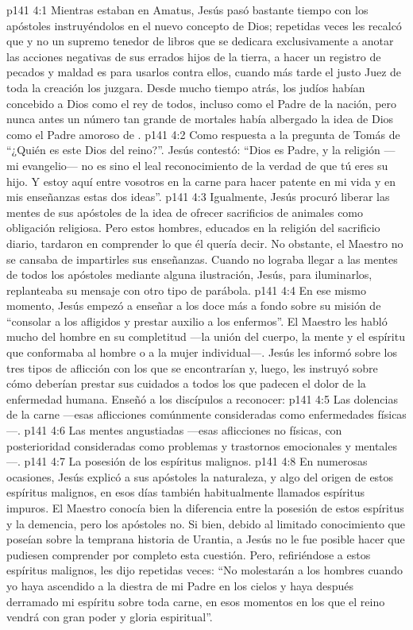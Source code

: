 \vs p141 4:1 Mientras estaban en Amatus, Jesús pasó bastante tiempo con los apóstoles instruyéndolos en el nuevo concepto de Dios; repetidas veces les recalcó que  y no un supremo tenedor de libros que se dedicara exclusivamente a anotar las acciones negativas de sus errados hijos de la tierra, a hacer un registro de pecados y maldad es para usarlos contra ellos, cuando más tarde el justo Juez de toda la creación los juzgara. Desde mucho tiempo atrás, los judíos habían concebido a Dios como el rey de todos, incluso como el Padre de la nación, pero nunca antes un número tan grande de mortales había albergado la idea de Dios como el Padre amoroso de .
\vs p141 4:2 Como respuesta a la pregunta de Tomás de “¿Quién es este Dios del reino?”. Jesús contestó: “Dios es  Padre, y la religión ---mi evangelio--- no es sino el leal reconocimiento de la verdad de que tú eres su hijo. Y estoy aquí entre vosotros en la carne para hacer patente en mi vida y en mis enseñanzas estas dos ideas”.
\vs p141 4:3 Igualmente, Jesús procuró liberar las mentes de sus apóstoles de la idea de ofrecer sacrificios de animales como obligación religiosa. Pero estos hombres, educados en la religión del sacrificio diario, tardaron en comprender lo que él quería decir. No obstante, el Maestro no se cansaba de impartirles sus enseñanzas. Cuando no lograba llegar a las mentes de todos los apóstoles mediante alguna ilustración, Jesús, para iluminarlos, replanteaba su mensaje con otro tipo de parábola.
\vs p141 4:4 \pc En ese mismo momento, Jesús empezó a enseñar a los doce más a fondo sobre su misión de “consolar a los afligidos y prestar auxilio a los enfermos”. El Maestro les habló mucho del hombre en su completitud ---la unión del cuerpo, la mente y el espíritu que conformaba al hombre o a la mujer individual---. Jesús les informó sobre los tres tipos de aflicción con los que se encontrarían y, luego, les instruyó sobre cómo deberían prestar sus cuidados a todos los que padecen el dolor de la enfermedad humana. Enseñó a los discípulos a reconocer:
\vs p141 4:5 Las dolencias de la carne ---esas aflicciones comúnmente consideradas como enfermedades físicas---.
\vs p141 4:6 Las mentes angustiadas ---esas aflicciones no físicas, con posterioridad consideradas como problemas y trastornos emocionales y mentales---.
\vs p141 4:7 La posesión de los espíritus malignos.
\vs p141 4:8 \pc En numerosas ocasiones, Jesús explicó a sus apóstoles la naturaleza, y algo del origen de estos espíritus malignos, en esos días también habitualmente llamados espíritus impuros. El Maestro conocía bien la diferencia entre la posesión de estos espíritus y la demencia, pero los apóstoles no. Si bien, debido al limitado conocimiento que poseían sobre la temprana historia de Urantia, a Jesús no le fue posible hacer que pudiesen comprender por completo esta cuestión. Pero, refiriéndose a estos espíritus malignos, les dijo repetidas veces: “No molestarán a los hombres cuando yo haya ascendido a la diestra de mi Padre en los cielos y haya después derramado mi espíritu sobre toda carne, en esos momentos en los que el reino vendrá con gran poder y gloria espiritual”.
